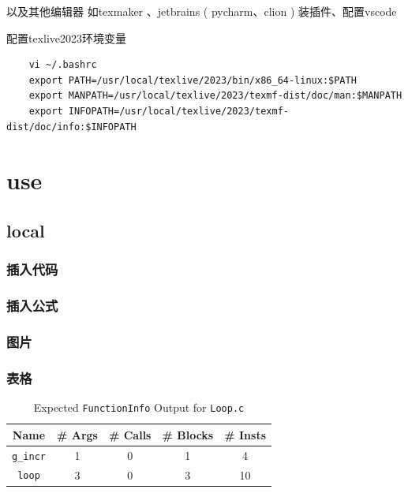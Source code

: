 \documentclass[11pt]{ctexart}
\begin{document}
以及其他编辑器 如texmaker 、jetbrains ( pycharm、clion ) 装插件、配置vscode


配置texlive2023环境变量

\begin{lstlisting}
	vi ~/.bashrc
	export PATH=/usr/local/texlive/2023/bin/x86_64-linux:$PATH
	export MANPATH=/usr/local/texlive/2023/texmf-dist/doc/man:$MANPATH
	export INFOPATH=/usr/local/texlive/2023/texmf-dist/doc/info:$INFOPATH
\end{lstlisting}




\newpage

\section{use}

\subsection{local}

\subsubsection{ 插入代码}

\subsubsection{插入公式}

\subsubsection{图片}


 
 \subsubsection{表格}
 
 \begin{table}[ht]
 	\centering
 	\caption{Expected \texttt{FunctionInfo} Output for \texttt{Loop.c}}
 	\begin{tabular}{*{5}{c}}
 		\toprule
 		Name & \# Args & \# Calls & \# Blocks & \# Insts \\
 		\midrule
 		\texttt{g\_incr} & 1 & 0 & 1 &  4 \\
 		\texttt{loop}    & 3 & 0 & 3 & 10 \\
 		\bottomrule
 	\end{tabular}
 	\label{functioninfo-loop-mb}
 \end{table}
 
\end{document}
